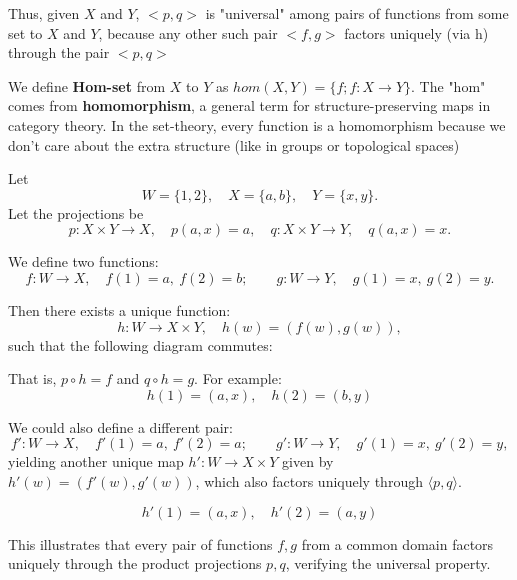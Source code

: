 Thus, given $X$ and $Y$, $<p, q>$ is "universal" among pairs of functions from some set to $X$ and $Y$, because any other such pair $<f, g>$ factors uniquely (via h) through the pair $<p ,q>$

We define \textbf{Hom-set} from $X$ to $Y$ as $hom(X, Y) = \{f; f: X \to Y\}$. The "hom" comes from \textbf{homomorphism}, a general term for structure-preserving maps in category theory. In the set-theory, every function is a homomorphism because we don't care about the extra structure (like in groups or topological spaces)



\begin{examplebox}[title={Universal Property of the Product}]
Let 
\[
W = \{1, 2\}, \quad X = \{a, b\}, \quad Y = \{x, y\}.
\]
Let the projections be 
\[
p: X \times Y \to X, \quad p(a, x) = a, \quad q: X \times Y \to Y, \quad q(a, x) = x.
\]

We define two functions:
\[
f: W \to X, \quad f(1) = a,\ f(2) = b; \qquad
g: W \to Y, \quad g(1) = x,\ g(2) = y.
\]

Then there exists a unique function:
\[
h: W \to X \times Y, \quad h(w) = (f(w), g(w)),
\]
such that the following diagram commutes:

\begin{center}
\end{center}

That is, \( p \circ h = f \) and \( q \circ h = g \). For example:
\[
h(1) = (a, x), \quad h(2) = (b, y)
\]

We could also define a different pair:
\[
f': W \to X, \quad f'(1) = a,\ f'(2) = a; \qquad
g': W \to Y, \quad g'(1) = x,\ g'(2) = y,
\]
yielding another unique map \( h': W \to X \times Y \) given by \( h'(w) = (f'(w), g'(w)) \), which also factors uniquely through \( \langle p, q \rangle \).

\[
h'(1) = (a, x), \quad h'(2) = (a, y)
\]

This illustrates that every pair of functions \( f, g \) from a common domain factors uniquely through the product projections \( p, q \), verifying the universal property.

\end{examplebox}
